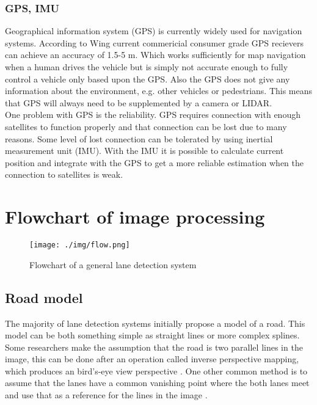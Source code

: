 \subsubsection{GPS, IMU}
Geographical information system (GPS) is currently widely used for navigation systems. According to Wing \cite{wing2011} current commericial consumer grade GPS recievers can achieve an accuracy of 1.5-5 m. Which works sufficiently for map navigation when a human drives the vehicle but is simply not accurate enough to fully control a vehicle only based upon the GPS. Also the GPS does not give any information about the environment, e.g. other vehicles or pedestrians. This means that GPS will always need to be supplemented by a camera or LIDAR.\\
 
One problem with GPS is the reliability. GPS requires connection with enough satellites to function properly and that connection can be lost due to many reasons. Some level of lost connection can be tolerated by using inertial measurement unit (IMU). With the IMU it is possible to calculate current position and integrate with the GPS to get a more reliable estimation when the connection to satellites is weak.

\section{Flowchart of image processing}

\begin{figure}[H]
  \texttt{[image: ./img/flow.png]}
  \centering
  \caption{Flowchart of a general lane detection system}
  \label{fig:Software architecture of the EMC2 platform}
\end{figure}


\subsection{Road model}
The majority of lane detection systems initially propose a model of a road. This model can be both something simple as straight lines or more complex splines. Some researchers make the assumption that the road is two parallel lines in the image, this can be done after an operation called inverse perspective mapping, which produces an bird's-eye view  perspective \cite{bertozzi1998gold}. One other common method is to assume that the lanes have a common vanishing point where the both lanes meet and use that as a reference for the lines in the image \cite{Yenikaya:2013:KVR:2522968.2522970}\cite{jingyu2013lane}.
